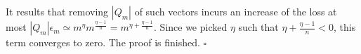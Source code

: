 It results that removing $|Q_m|$ of such vectors incurs an increase of the loss at most 
$|Q_m| \epsilon_m \simeq m^\eta m^{\frac{\eta-1}{n} } = m^{\eta + \frac{\eta-1}{n}}$. 
Since we picked $\eta$ such that $\eta + \frac{\eta-1}{n} <0$, this term converges to zero. The proof is finished. $\square$

%
%
%
%
%




